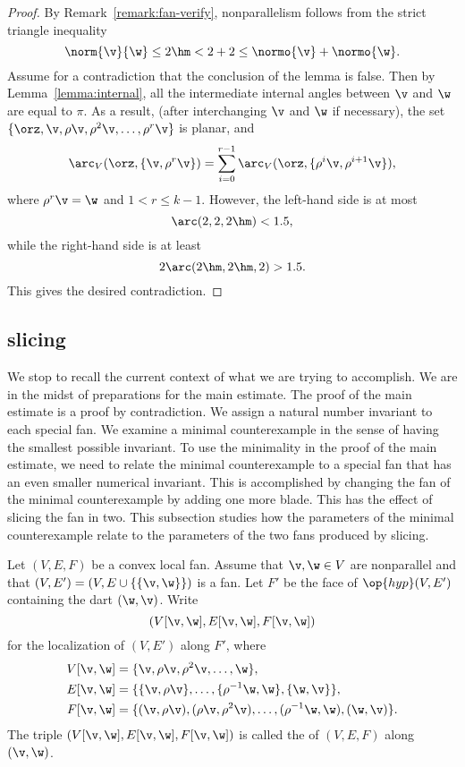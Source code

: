 \begin{proof} By Remark~\ref{remark:fan-verify}, nonparallelism follows
from the strict triangle inequality
\[ 
\norm{\v}{\w} \le 2\hm < 2 + 2 \le \normo{\v} + \normo{\w}.
\] 
Assume for a contradiction that the conclusion of the lemma is false.
Then by Lemma~\ref{lemma:internal}, all the intermediate internal
angles between $\v$ and $\w$ are equal to $\pi$.  As a result, (after
interchanging $\v$ and $\w$ if necessary), the set
$\{\orz,\v,\rho\v,\rho^2\v,\ldots,\rho^r\v\}$ is planar, and
\[ 
  \arc_V(\orz,\{\v,\rho^r\v\}) 
= \sum_{i=0}^{r-1} \arc_V(\orz,\{\rho^i\v,\rho^{i+1}\v\}),
\] 
where $\rho^r \v = \w$ and $1 < r \le k-1$.
However, the left-hand side is at most
\[ 
\arc(2,2,2\hm) < 1.5,
\] 
while the right-hand side is at least
\[ 
2\arc(2\hm,2\hm,2) > 1.5.
\] 
This gives the desired contradiction.
\end{proof}

\subsection{slicing}

We stop to recall the current context of what we are trying to accomplish.
We are in the midst of preparations for the main estimate.
The proof of the main estimate is a proof by contradiction.  We 
assign a natural number invariant to each special fan.  We 
examine a minimal counterexample in the sense of having the smallest
possible invariant.  To use the minimality in the proof of the main
estimate, we need to relate the minimal counterexample to a special
fan that has an even smaller numerical invariant. This is accomplished
by changing the fan of the minimal counterexample by adding one more
blade.  This has the effect of slicing the fan in two.  This
subsection studies how the parameters of the minimal counterexample
relate to the parameters of the two fans produced by slicing.

\begin{definition}[slice]
 Let $(V,E,F)$ be a convex local fan.  Assume that
$\v,\w\in V$ are nonparallel and that $(V,E')=(V,E\cup
\{\{\v,\w\}\})$ is a fan.  Let $F'$ be the face of $\op{hyp}(V,E')$
containing the dart $(\w,\v)$.  Write
\[ (V[\v,\w],E[\v,\w],F[\v,\w])\] 
for the localization of $(V,E')$ along $F'$, where
\begin{align*}
  V[\v,\w] &= \{\v,\rho \v,\rho^2 \v,\ldots,\w\},\\
  E[\v,\w] &= \{\{\v,\rho \v\},\ldots,\{\rho^{-1}\w,\w\},\{\w,\v\}\},\\
  F[\v,\w] &= \{(\v,\rho \v),(\rho \v,\rho^2 \v),
 \ldots,(\rho^{-1}\w,\w),(\w,\v)\}.
\end{align*}
The triple $(V[\v,\w],E[\v,\w],F[\v,\w])$ is called the
 of $(V,E,F)$ along $(\v,\w)$.
\end{definition}
%

